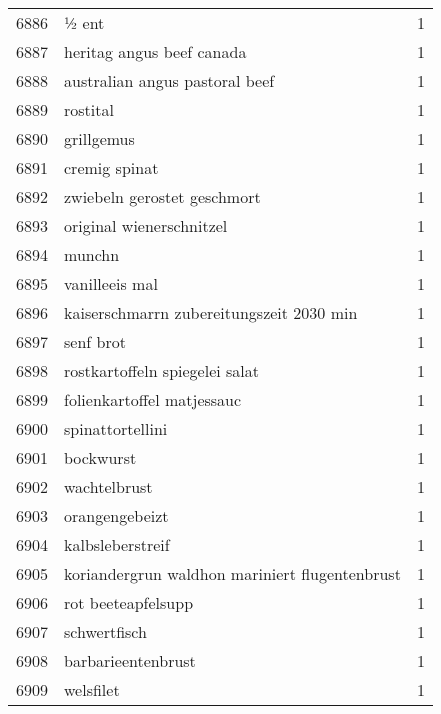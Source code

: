\begin{tabular}{llr}
6886 &                                              ½ ent &      1 \\
6887 &                          heritag angus beef canada &      1 \\
6888 &                     australian angus pastoral beef &      1 \\
6889 &                                           rostital &      1 \\
6890 &                                         grillgemus &      1 \\
6891 &                                      cremig spinat &      1 \\
6892 &                        zwiebeln gerostet geschmort &      1 \\
6893 &                           original wienerschnitzel &      1 \\
6894 &                                             munchn &      1 \\
6895 &                                     vanilleeis mal &      1 \\
6896 &           kaiserschmarrn zubereitungszeit 2030 min &      1 \\
6897 &                                          senf brot &      1 \\
6898 &                     rostkartoffeln spiegelei salat &      1 \\
6899 &                         folienkartoffel matjessauc &      1 \\
6900 &                                   spinattortellini &      1 \\
6901 &                                          bockwurst &      1 \\
6902 &                                       wachtelbrust &      1 \\
6903 &                                     orangengebeizt &      1 \\
6904 &                                   kalbsleberstreif &      1 \\
6905 &     koriandergrun waldhon mariniert flugentenbrust &      1 \\
6906 &                                 rot beeteapfelsupp &      1 \\
6907 &                                       schwertfisch &      1 \\
6908 &                                 barbarieentenbrust &      1 \\
6909 &                                          welsfilet &      1 \\

\end{tabular}
